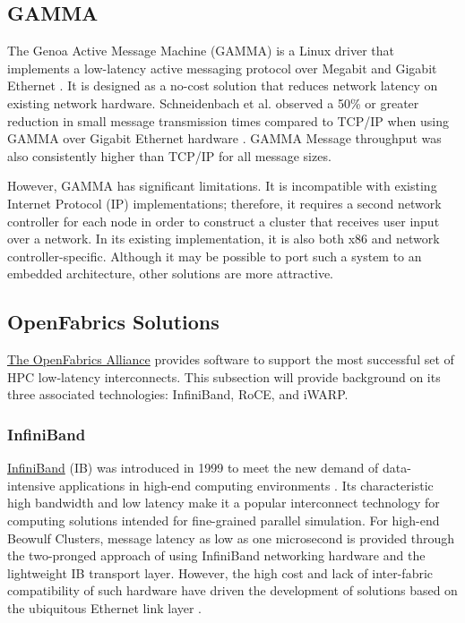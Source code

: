 \documentclass[11pt]{book}
\begin{document}
\subsection{\textbf{GAMMA}}

The Genoa Active Message Machine (GAMMA) is a Linux driver that implements a
low-latency active messaging protocol over Megabit and Gigabit Ethernet
\cite{gamma}. It is designed as a no-cost solution that reduces network latency
on existing network hardware. Schneidenbach et al. observed a 50\% or greater
reduction in small message transmission times compared to TCP/IP when using
GAMMA over Gigabit Ethernet hardware \cite{schneidenbach-03}. GAMMA
Message throughput was also consistently higher than TCP/IP for all message
sizes.

However, GAMMA has significant limitations. It is incompatible with existing
Internet Protocol (IP) implementations; therefore, it requires a second network
controller for each node in order to construct a cluster that receives user
input over a network. In its existing implementation, it is also both x86 and
network controller-specific. Although it may be possible to port such a system
to an embedded architecture, other solutions are more attractive.

\subsection{\textbf{OpenFabrics Solutions}}

\href{www.openfabrics.org}{The OpenFabrics Alliance} provides software to
support the most successful set of HPC low-latency interconnects. This
subsection will provide background on its three associated technologies:
InfiniBand, RoCE, and iWARP.

\subsubsection{\textbf{InfiniBand}}

\href {www.infinibandta.org}{InfiniBand} (IB) was introduced in
1999 to meet the new demand of data-intensive applications in high-end computing
environments \cite{InfiniBandTABase-07}. Its characteristic high bandwidth and
low latency make it a popular interconnect technology for computing solutions
intended for fine-grained parallel simulation. For high-end Beowulf Clusters,
message latency as low as one microsecond is provided through the two-pronged
approach of using InfiniBand networking hardware and the lightweight IB
transport layer. However, the high cost and lack of inter-fabric compatibility
of such hardware have driven the development of solutions based on the
ubiquitous Ethernet link layer \cite{roce-announce}.
\end{document}
